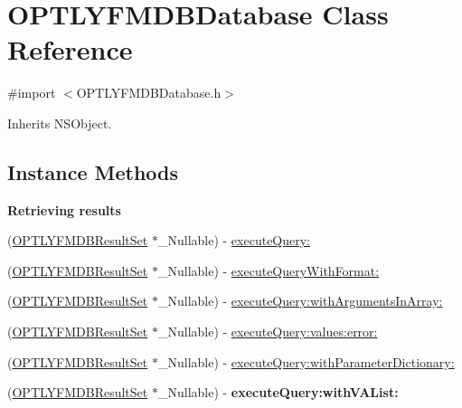 \hypertarget{interface_o_p_t_l_y_f_m_d_b_database}{}\section{O\+P\+T\+L\+Y\+F\+M\+D\+B\+Database Class Reference}
\label{interface_o_p_t_l_y_f_m_d_b_database}


{\ttfamily \#import $<$O\+P\+T\+L\+Y\+F\+M\+D\+B\+Database.\+h$>$}



Inherits N\+S\+Object.

\subsection*{Instance Methods}
\begin{Indent}\textbf{ Retrieving results}\par
{\em 

 

 }\begin{DoxyCompactItemize}
\item 
(\mbox{\hyperlink{interface_o_p_t_l_y_f_m_d_b_result_set}{O\+P\+T\+L\+Y\+F\+M\+D\+B\+Result\+Set}} $\ast$\+\_\+\+Nullable) -\/ \mbox{\hyperlink{interface_o_p_t_l_y_f_m_d_b_database_ad749b1bd0f19dc48b36867d1622d201a}{execute\+Query\+:}}
\item 
(\mbox{\hyperlink{interface_o_p_t_l_y_f_m_d_b_result_set}{O\+P\+T\+L\+Y\+F\+M\+D\+B\+Result\+Set}} $\ast$\+\_\+\+Nullable) -\/ \mbox{\hyperlink{interface_o_p_t_l_y_f_m_d_b_database_a679072fb9c6007f6700d3506658d9de3}{execute\+Query\+With\+Format\+:}}
\item 
(\mbox{\hyperlink{interface_o_p_t_l_y_f_m_d_b_result_set}{O\+P\+T\+L\+Y\+F\+M\+D\+B\+Result\+Set}} $\ast$\+\_\+\+Nullable) -\/ \mbox{\hyperlink{interface_o_p_t_l_y_f_m_d_b_database_ad30659f8bbdc3b55166b307f5f130cbe}{execute\+Query\+:with\+Arguments\+In\+Array\+:}}
\item 
(\mbox{\hyperlink{interface_o_p_t_l_y_f_m_d_b_result_set}{O\+P\+T\+L\+Y\+F\+M\+D\+B\+Result\+Set}} $\ast$\+\_\+\+Nullable) -\/ \mbox{\hyperlink{interface_o_p_t_l_y_f_m_d_b_database_a6e88b56561812ad35813f9053a85cad2}{execute\+Query\+:values\+:error\+:}}
\item 
(\mbox{\hyperlink{interface_o_p_t_l_y_f_m_d_b_result_set}{O\+P\+T\+L\+Y\+F\+M\+D\+B\+Result\+Set}} $\ast$\+\_\+\+Nullable) -\/ \mbox{\hyperlink{interface_o_p_t_l_y_f_m_d_b_database_a21ab2761ffb8dbae2a6ef70106010122}{execute\+Query\+:with\+Parameter\+Dictionary\+:}}
\item 
\mbox{\label{interface_o_p_t_l_y_f_m_d_b_database_aeee5f94a8e375840c1b5e4094a4e4b04}} 
(\mbox{\hyperlink{interface_o_p_t_l_y_f_m_d_b_result_set}{O\+P\+T\+L\+Y\+F\+M\+D\+B\+Result\+Set}} $\ast$\+\_\+\+Nullable) -\/ {\bfseries execute\+Query\+:with\+V\+A\+List\+:}
\end{DoxyCompactItemize}
\end{Indent}
